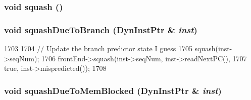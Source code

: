 \hypertarget{classBackEnd_a3c68c455d9207edd23ae3bcb7971e653}{
\subsubsection[{squash}]{\setlength{\rightskip}{0pt plus 5cm}void squash ()}}
\label{classBackEnd_a3c68c455d9207edd23ae3bcb7971e653}
\hypertarget{classBackEnd_a05c89a1532adb13cc0632fc3bb600add}{
\subsubsection[{squashDueToBranch}]{\setlength{\rightskip}{0pt plus 5cm}void squashDueToBranch ({\bf DynInstPtr} \& {\em inst})}}
\label{classBackEnd_a05c89a1532adb13cc0632fc3bb600add}



\begin{DoxyCode}
1703 {
1704     // Update the branch predictor state I guess
1705     squash(inst->seqNum);
1706     frontEnd->squash(inst->seqNum, inst->readNextPC(),
1707                      true, inst->mispredicted());
1708 }
\end{DoxyCode}
\hypertarget{classBackEnd_a5fcf443dc6ada1ab1936df923c3205d2}{
\subsubsection[{squashDueToMemBlocked}]{\setlength{\rightskip}{0pt plus 5cm}void squashDueToMemBlocked ({\bf DynInstPtr} \& {\em inst})}}
\label{classBackEnd_a5fcf443dc6ada1ab1936df923c3205d2}



